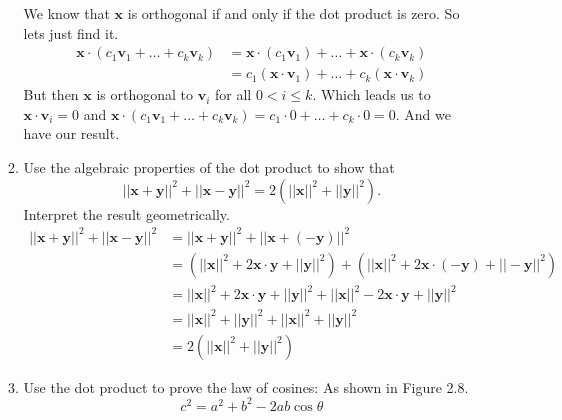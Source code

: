 \documentclass[letterpaper]{article}
\begin{document}
\begin{enumerate}
\begin{enumerate}
    We know that $\mathbf{x}$ is orthogonal if and only if the dot product is zero. So lets just find it.
    \begin{align*}
      \mathbf{x}\cdot(c_1\mathbf{v}_1+\dots+c_k\mathbf{v}_k)
      &=\mathbf{x}\cdot(c_1\mathbf{v}_1)+\dots+\mathbf{x}\cdot(c_k\mathbf{v}_k)\\
      &=c_1(\mathbf{x}\cdot\mathbf{v}_1)+\dots+c_k(\mathbf{x}\cdot\mathbf{v}_k)
    \end{align*}
    But then $\mathbf{x}$ is orthogonal to $\mathbf{v}_i$ for all $0<i\le k$. Which leads us to $\mathbf{x}\cdot\mathbf{v}_i=0$ and $\mathbf{x}\cdot(c_1\mathbf{v}_1+\dots+c_k\mathbf{v}_k)=c_1\cdot0+\dots+c_k\cdot0=0$. And we have our result.
  \setcounter{enumii}{12}
  \item
    Use the algebraic properties of the dot product to show that
    \[||\mathbf{x}+\mathbf{y}||^2+||\mathbf{x}-\mathbf{y}||^2=2(||\mathbf{x}||^2+||\mathbf{y}||^2).\]
    Interpret the result geometrically.
    \begin{align*}
      ||\mathbf{x}+\mathbf{y}||^2+||\mathbf{x}-\mathbf{y}||^2
      &=||\mathbf{x}+\mathbf{y}||^2+||\mathbf{x}+(-\mathbf{y})||^2\\
      &=(||\mathbf{x}||^2+2\mathbf{x}\cdot\mathbf{y}+||\mathbf{y}||^2)+(||\mathbf{x}||^2+2\mathbf{x}\cdot(-\mathbf{y})+||-\mathbf{y}||^2)\\
      &=||\mathbf{x}||^2+2\mathbf{x}\cdot\mathbf{y}+||\mathbf{y}||^2+||\mathbf{x}||^2-2\mathbf{x}\cdot\mathbf{y}+||\mathbf{y}||^2\\
      &=||\mathbf{x}||^2+||\mathbf{y}||^2+||\mathbf{x}||^2+||\mathbf{y}||^2\\
      &=2(||\mathbf{x}||^2+||\mathbf{y}||^2)
    \end{align*}
  \item
    Use the dot product to prove the law of cosines: As shown in Figure 2.8.
    \[c^2=a^2+b^2-2ab\cos \theta\]


\end{enumerate}
\end{enumerate}
\end{document}
